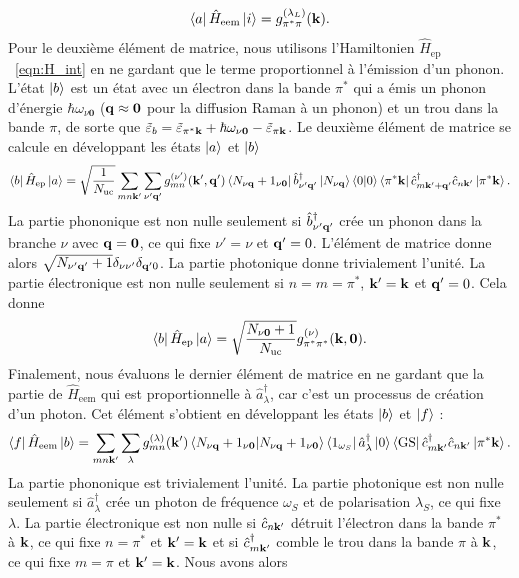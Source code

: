 \begin{equation}
    \bra{a}\hat{H}_\text{eem}\ket{i}=g_{\pi^*\pi}^{(\lambda_L)}(\mathbf{k}).
\end{equation}
Pour le deuxième élément de matrice, nous utilisons l'Hamiltonien $\hat{H}_\text{ep}$~\eqref{eqn:H_int} en ne gardant que le terme proportionnel à l'émission d'un phonon. L'état $\ket{b}$ est un état avec un électron dans la bande $\pi^*$ qui a émis un phonon d'énergie $\hbar\omega_{\nu\bm 0}$ ($\mathbf{q}\approx \bm 0$ pour la diffusion Raman à un phonon) et un trou dans la bande $\pi$, de sorte que $\tilde{\varepsilon}_b = \tilde{\varepsilon}_{\pi^*\mathbf{k}}+\hbar\omega_{\nu\bm 0}-\tilde{\varepsilon}_{\pi\mathbf{k}}$. Le deuxième élément de matrice se calcule en développant les états $\ket{a}$ et $\ket{b}$
\begin{equation}
    \bra{b}\hat{H}_\text{ep}\ket{a} = \sqrt{\frac{1}{N_\text{uc}}}\sum_{mn\mathbf{k}'}\sum_{\nu'\mathbf{q}'}g_{mn}^{(\nu')}(\mathbf{k}',\mathbf{q}')\bra{N_{\nu\mathbf{q}}+1_{\nu\bm 0}}\hat{b}^\dag_{\nu'\mathbf{q}'}\ket{N_{\nu\mathbf{q}}}\braket{0}{0}\bra{\pi^*\mathbf{k}}\hat{c}^\dag_{m\mathbf{k}'+\mathbf{q}'}\hat{c}_{n\mathbf{k}'}\ket{\pi^*\mathbf{k}}.
\end{equation}
La partie phononique est non nulle seulement si $\hat{b}^\dag_{\nu'\mathbf{q}'}$ crée un phonon dans la branche $\nu$ avec $\mathbf{q}=\bm 0$, ce qui fixe $\nu'=\nu$ et $\mathbf{q}'=0$. L'élément de matrice donne alors $\sqrt{N_{\nu'\mathbf{q}'}+1}\delta_{\nu\nu'}\delta_{\mathbf{q}'0}$. La partie photonique donne trivialement l'unité. La partie électronique est non nulle seulement si $n=m=\pi^*$, $\mathbf{k}'=\mathbf{k}$ et $\mathbf{q}'=0$. Cela donne
\begin{equation}
    \bra{b}\hat{H}_\text{ep}\ket{a} = \sqrt{\frac{N_{\nu\bm 0}+1}{N_\text{uc}}}g_{\pi^*\pi^*}^{(\nu)}(\mathbf{k},\bm 0).
\end{equation}
Finalement, nous évaluons le dernier élément de matrice en ne gardant que la partie de $\hat{H}_\text{eem}$ qui est proportionnelle à $\hat{a}^\dag_{\lambda}$, car c'est un processus de création d'un photon. Cet élément s'obtient en développant les états $\ket{b}$ et $\ket{f}$ :
\begin{equation}
    \bra{f}\hat{H}_\text{eem}\ket{b} = \sum_{mn\mathbf{k}'}\sum_{\lambda}g_{mn}^{(\lambda)}(\mathbf{k}')\braket{N_{\nu\mathbf{q}}+1_{\nu\bm 0}}{N_{\nu\mathbf{q}}+1_{\nu\bm 0}}\bra{1_{\omega_S}}\hat{a}_{\lambda}^\dag\ket{0}\bra{\text{GS}}\hat{c}_{m\mathbf{k}'}^\dag\hat{c}_{n\mathbf{k}'}\ket{\pi^*\mathbf{k}}.
\end{equation}
La partie phononique est trivialement l'unité. La partie photonique est non nulle seulement si $\hat{a}_\lambda^\dag$ crée un photon de fréquence $\omega_S$ et de polarisation $\lambda_S$, ce qui fixe $\lambda$. La partie électronique est non nulle si $\hat{c}_{n\mathbf{k}'}$ détruit l'électron dans la bande $\pi^*$ à $\mathbf{k}$, ce qui fixe $n=\pi^*$ et $\mathbf{k}'=\mathbf{k}$ et si $\hat{c}_{m\mathbf{k}'}^\dag$ comble le trou dans la bande $\pi$ à $\mathbf{k}$, ce qui fixe $m=\pi$ et $\mathbf{k}'=\mathbf{k}$. Nous avons alors
